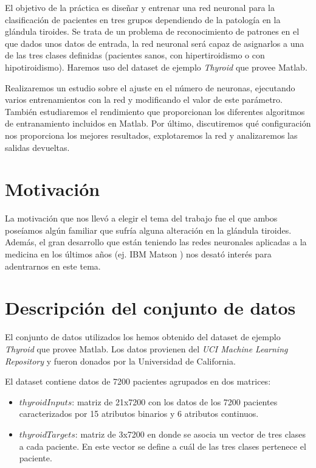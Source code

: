 \documentclass[a4paper,12pt,titlepage]{article}
\begin{document}
El objetivo de la práctica es diseñar y entrenar una red neuronal para la clasificación de pacientes en tres grupos dependiendo de la patología en la glándula tiroides. Se trata de un problema de reconocimiento de patrones en el que dados unos datos de entrada, la red neuronal será capaz de asignarlos a una de las tres clases definidas (pacientes sanos, con hipertiroidismo o con hipotiroidismo). Haremos uso del dataset de ejemplo \emph{Thyroid} que provee Matlab.

Realizaremos un estudio sobre el ajuste en el número de neuronas, ejecutando varios entrenamientos con la red y modificando el valor de este parámetro. También estudiaremos el rendimiento que proporcionan los diferentes algoritmos de entranamiento incluidos en Matlab. Por último, discutiremos qué configuración nos proporciona los mejores resultados, explotaremos la red y analizaremos las salidas devueltas.

\section{Motivación}

La motivación que nos llevó a elegir el tema del trabajo fue el que ambos poseíamos algún familiar que sufría alguna alteración en la glándula tiroides. Además, el gran desarrollo que están teniendo las redes neuronales aplicadas a la medicina en los últimos años (ej. IBM Matson \citep{wiki:watson}) nos desató interés para adentrarnos en este tema.

\section{Descripción del conjunto de datos}

El conjunto de datos utilizados los hemos obtenido del dataset de ejemplo \emph{Thyroid} que provee Matlab. Los datos provienen del \emph{UCI Machine Learning Repository} \citep{Asuncion+Newman:2007} y fueron donados por la Universidad de California.

El dataset contiene datos de 7200 pacientes agrupados en dos matrices:

\begin{itemize}[noitemsep]
	\item $thyroidInputs$: matriz de 21x7200 con los datos de los 7200 pacientes caracterizados por 15 atributos binarios y 6 atributos continuos.
	\item $thyroidTargets$: matriz de 3x7200 en donde se asocia un vector de tres clases a cada paciente. En este vector se define a cuál de las tres clases pertenece el paciente.
\end{itemize}
\end{document}
